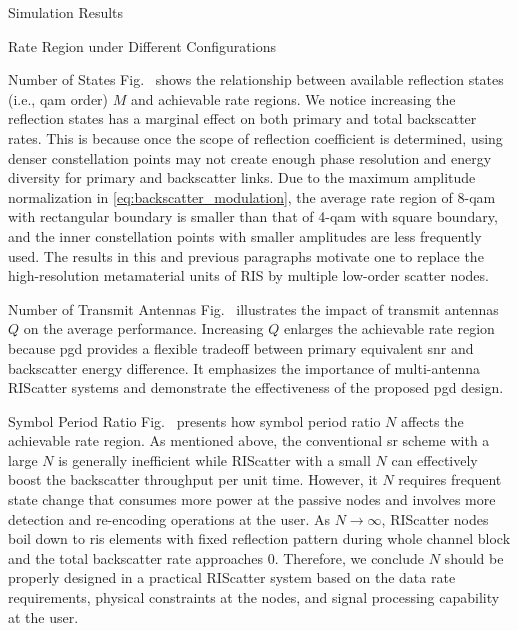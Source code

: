 \documentclass[journal]{IEEEtran}
\begin{document}
\begin{section}{Simulation Results}
\begin{subsection}{Rate Region under Different Configurations}
		\begin{subsubsection}{Number of States}
			Fig.~ shows the relationship between available reflection states (i.e., \gls{qam} order) $M$ and achievable rate regions.
			We notice increasing the reflection states has a marginal effect on both primary and total backscatter rates.
			This is because once the scope of reflection coefficient is determined, using denser constellation points may not create enough phase resolution and energy diversity for primary and backscatter links.
			Due to the maximum amplitude normalization in \eqref{eq:backscatter_modulation}, the average rate region of \num{8}-\gls{qam} with rectangular boundary is smaller than that of \num{4}-\gls{qam} with square boundary, and the inner constellation points with smaller amplitudes are less frequently used.
			The results in this and previous paragraphs motivate one to replace the high-resolution metamaterial units of RIS by multiple low-order scatter nodes.
		\end{subsubsection}

		\begin{subsubsection}{Number of Transmit Antennas}
			Fig.~ illustrates the impact of transmit antennas $Q$ on the average performance.
			Increasing $Q$ enlarges the achievable rate region because \gls{pgd} provides a flexible tradeoff between primary equivalent \gls{snr} and backscatter energy difference.
			It emphasizes the importance of multi-antenna RIScatter systems and demonstrate the effectiveness of the proposed \gls{pgd} design.
		\end{subsubsection}

		\begin{subsubsection}{Symbol Period Ratio}
			Fig.~ presents how symbol period ratio $N$ affects the achievable rate region.
			As mentioned above, the conventional \gls{sr} scheme with a large $N$ is generally inefficient while RIScatter with a small $N$ can effectively boost the backscatter throughput per unit time.
			However, it $N$ requires frequent state change that consumes more power at the passive nodes and involves more detection and re-encoding operations at the user.
			As $N \to \infty$, RIScatter nodes boil down to \gls{ris} elements with fixed reflection pattern during whole channel block and the total backscatter rate approaches \num{0}.
			Therefore, we conclude $N$ should be properly designed in a practical RIScatter system based on the data rate requirements, physical constraints at the nodes, and signal processing capability at the user.
		\end{subsubsection}


\end{subsection}
\end{section}
\end{document}
